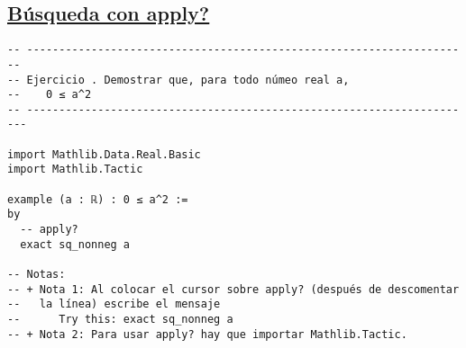 \subsection{\href{./src/Basicos/Uso\_de\_library\_search.lean}{Búsqueda con apply?}}
\label{sec:org73751be}
\begin{verbatim}
-- ---------------------------------------------------------------------
-- Ejercicio . Demostrar que, para todo númeo real a,
--    0 ≤ a^2
-- ----------------------------------------------------------------------

import Mathlib.Data.Real.Basic
import Mathlib.Tactic

example (a : ℝ) : 0 ≤ a^2 :=
by
  -- apply?
  exact sq_nonneg a

-- Notas:
-- + Nota 1: Al colocar el cursor sobre apply? (después de descomentar
--   la línea) escribe el mensaje
--      Try this: exact sq_nonneg a
-- + Nota 2: Para usar apply? hay que importar Mathlib.Tactic.
\end{verbatim}

